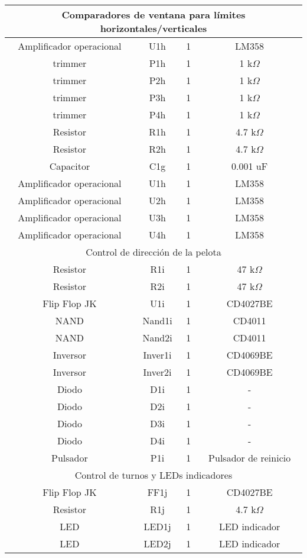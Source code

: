 \begin{longtable}{cccc}
\midrule
\multicolumn{4}{c}{Comparadores de ventana para l\'imites horizontales/verticales} \\ 
\midrule
Amplificador operacional & U1h & 1 & LM358 \\
trimmer & P1h & 1 & 1 k$\Omega$ \\
trimmer & P2h & 1 & 1 k$\Omega$ \\
trimmer & P3h & 1 & 1 k$\Omega$ \\
trimmer & P4h & 1 & 1 k$\Omega$ \\
Resistor & R1h & 1 & 4.7 k$\Omega$ \\  
Resistor & R2h & 1 & 4.7 k$\Omega$ \\
Capacitor & C1g & 1 & 0.001 uF \\
Amplificador operacional & U1h & 1 & LM358 \\
Amplificador operacional & U2h & 1 & LM358 \\
Amplificador operacional & U3h & 1 & LM358 \\
Amplificador operacional & U4h & 1 & LM358 \\


\midrule
\multicolumn{4}{c}{Control de direcci\'on de la pelota} \\ 
\midrule
Resistor & R1i & 1 & 47 k$\Omega$ \\
Resistor & R2i & 1 & 47 k$\Omega$ \\
Flip Flop JK & U1i & 1 & CD4027BE \\  
NAND & Nand1i & 1 & CD4011 \\
NAND & Nand2i & 1 & CD4011 \\
Inversor & Inver1i & 1 & CD4069BE \\
Inversor & Inver2i & 1 & CD4069BE \\
Diodo & D1i & 1 & - \\ 
Diodo & D2i & 1 & - \\  
Diodo & D3i & 1 & - \\
Diodo & D4i & 1 & - \\ 
Pulsador & P1i & 1 & Pulsador de reinicio \\

\midrule
\multicolumn{4}{c}{Control de turnos y LEDs indicadores} \\ 
\midrule
Flip Flop JK & FF1j & 1 & CD4027BE \\  
Resistor & R1j & 1 & 4.7 k$\Omega$ \\  
LED & LED1j & 1 & LED indicador \\  
LED & LED2j & 1 & LED indicador \\  

\end{longtable}


